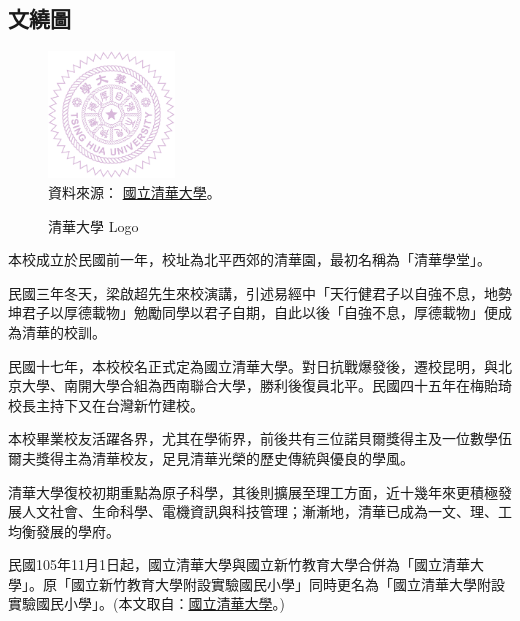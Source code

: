 \documentclass[utf8,12pt]{article} %
\begin{document}
\subsection{文繞圖}
%
%
\begin{spacing}{1.5}
%
\begin{figure} %
\centering
\includegraphics[width=0.3\textwidth]{Fig/nthulogo}\\
\footnotesize{資料來源：
		\href{https://www.nthu.edu.tw/files/cis/cis-1.pdf}{國立清華大學}。}
\caption{清華大學 Logo}
\end{figure}
%
本校成立於民國前一年，校址為北平西郊的清華園，最初名稱為「清華學堂」。

民國三年冬天，梁啟超先生來校演講，引述易經中「天行健君子以自強不息，地勢坤君子以厚德載物」勉勵同學以君子自期，自此以後「自強不息，厚德載物」便成為清華的校訓。

民國十七年，本校校名正式定為國立清華大學。對日抗戰爆發後，遷校昆明，與北京大學、南開大學合組為西南聯合大學，勝利後復員北平。民國四十五年在梅貽琦校長主持下又在台灣新竹建校。

本校畢業校友活躍各界，尤其在學術界，前後共有三位諾貝爾獎得主及一位數學伍爾夫獎得主為清華校友，足見清華光榮的歷史傳統與優良的學風。

清華大學復校初期重點為原子科學，其後則擴展至理工方面，近十幾年來更積極發展人文社會、生命科學、電機資訊與科技管理；漸漸地，清華已成為一文、理、工均衡發展的學府。

民國105年11月1日起，國立清華大學與國立新竹教育大學合併為「國立清華大學」。原「國立新竹教育大學附設實驗國民小學」同時更名為「國立清華大學附設實驗國民小學」。(本文取自：\href{https://www.nthu.edu.tw/about/nthuIntro}{國立清華大學}。)
%
\end{spacing}
%
%
%
\end{document}
